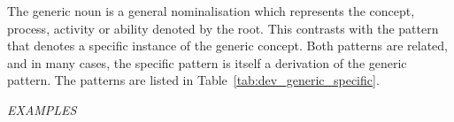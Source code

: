 \documentclass[grammar]{subfiles}
\begin{document}
  The generic noun is a general nominalisation which represents the concept, process, activity or ability denoted by the root. 
  This contrasts with the pattern that denotes a specific instance of the generic concept. 
  Both patterns are related, and in many cases, the specific pattern is itself a derivation of the generic pattern. 
  The patterns are listed in Table~\ref{tab:dev_generic_specific}.

  \begin{table}[htpb]\small\capstart
    \caption{Generic and specific noun forms\label{tab:dev_generic_specific}}
  \end{table}

  \begin{exe}
    \ex \emph{EXAMPLES}
  \end{exe}








\end{document}

